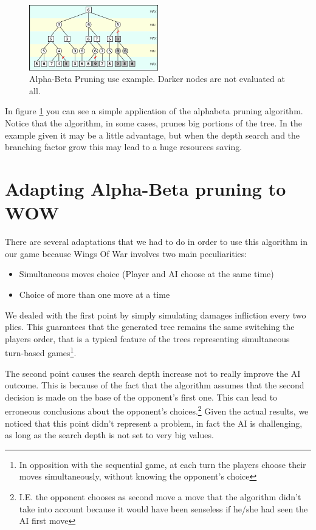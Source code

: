 \begin{figure}[htbp]
  \centering
    \includegraphics[width=0.5\textwidth]{images/alphabeta_pruning.png}
  \caption{Alpha-Beta Pruning use example. Darker nodes are not evaluated at all.}
  \label{fig:alphabeta_example}
\end{figure}

In figure \ref{fig:alphabeta_example} you can see a simple application of the alphabeta pruning algorithm. Notice that the algorithm, in some cases, prunes big portions of the tree. In the example given it may be a little advantage, but when the depth search and the branching factor grow this may lead to a huge resources saving.


\section{Adapting Alpha-Beta pruning to WOW}\label{sec:minimaxwow}
There are several adaptations that we had to do in order to use this algorithm in our game because Wings Of War involves two main peculiarities:
\begin{itemize}
\item Simultaneous moves choice (Player and AI choose at the same time)
\item Choice of more than one move at a time
\end{itemize}

We dealed with the first point by simply simulating damages infliction every two plies.
This guarantees that the generated tree remains the same switching the players order, that is a typical feature of the trees representing simultaneous turn-based games\footnote{In opposition with the sequential game, at each turn the players choose their moves simultaneously, without knowing the opponent's choice}.

The second point causes the search depth increase not to really improve the AI outcome. This is because of the fact that the algorithm assumes that the second decision is made on the base of the opponent's first one. This can lead to erroneous conclusions about the opponent's choices.\footnote{I.E. the opponent chooses as second move a move that the algorithm didn't take into account because it would have been senseless if he/she had seen the AI first move}
Given the actual results, we noticed that this point didn't represent a problem, in fact the AI is challenging, as long as the search depth is not set to very big values.\\

